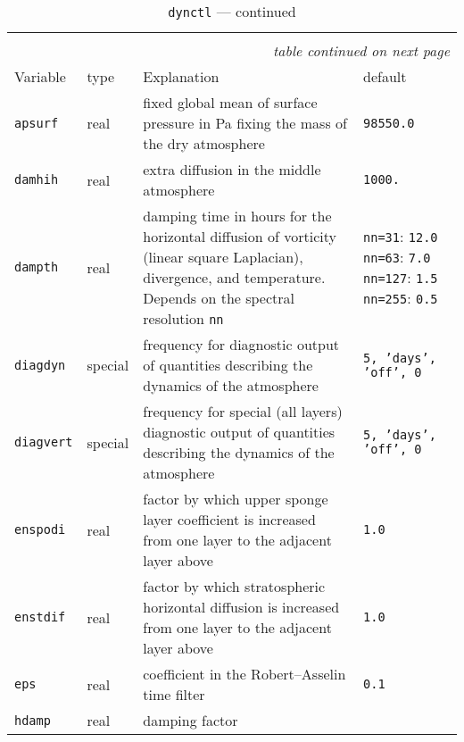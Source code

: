 \begin{longtable}{l@{\extracolsep\fill}lp{5.0cm}p{3.0cm}}
\hline\hline\caption[Namelist {\tt dynctl}]{Namelist
  {\tt dynctl}}\\\hline\label{tabdynctl}
\endfirsthead
\caption[]{{\tt dynctl} --- continued}\\\hline
\endhead
\hline\multicolumn{4}{r}{\slshape table continued on next page}\\
\endfoot
\hline %
\endlastfoot
Variable & type & Explanation & default \\\hline
{\tt apsurf}\index{namelist variables!apsurf}
 & real & fixed global mean of surface pressure
  in Pa fixing the mass of the dry atmosphere & {\tt 98550.0} \\
{\tt damhih}\index{namelist variables!damhih}
 & real & extra diffusion in the middle atmosphere
& {\tt 1000.} \\
{\tt dampth}\index{namelist variables!dampth}
 & real & damping time in hours for the horizontal
  diffusion of vorticity (linear square Laplacian), divergence, and
  temperature. Depends on the spectral resolution {\tt nn} & 
  {\tt nn=31}: {\tt 12.0} \newline
  {\tt nn=63}: {\tt 7.0} \newline
  {\tt nn=127}: {\tt 1.5} \newline
  {\tt nn=255}: {\tt 0.5} \\
{\tt diagdyn}\index{namelist variables!diagdyn}
 & special & frequency for diagnostic output of
  quantities describing the dynamics of the atmosphere & {\tt 5,
    'days', 'off', 0} \\
{\tt diagvert}\index{namelist variables!diagvert}
 & special & frequency for special (all layers)
  diagnostic output of 
  quantities describing the dynamics of the atmosphere & {\tt 5,
    'days', 'off', 0} \\
{\tt enspodi}\index{namelist variables!enspodi}
 & real & factor by which upper sponge layer
  coefficient is increased from one layer to the adjacent layer above
  & {\tt 1.0}\\ 
{\tt enstdif}\index{namelist variables!enstdif} 
& real & factor by which stratospheric horizontal
  diffusion is increased from one layer to the adjacent layer above &
  {\tt 1.0} \\
{\tt eps}\index{namelist variables!eps} & real & coefficient in the Robert--Asselin time
  filter & {\tt 0.1} \\
{\tt hdamp}\index{namelist variables!hdamp} & real & damping factor

\end{longtable}
